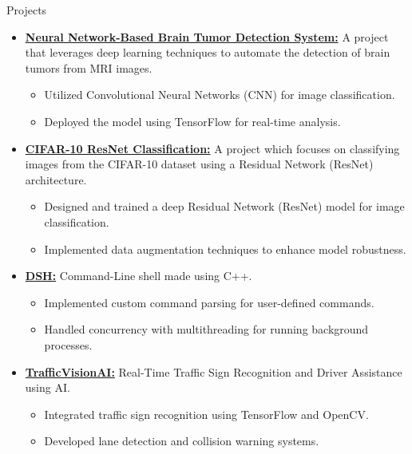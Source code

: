 \documentclass{resume} %
\begin{document}
\begin{rSection}{Projects}

\begin{itemize}  
    \item{\href{https://github.com/mystichronicle/Brain-Tumor-Detection}{{\bf Neural Network-Based Brain Tumor Detection System:}} 
    A project that leverages deep learning techniques to automate the detection of brain tumors from MRI images.
    \begin{itemize}
        \item Utilized Convolutional Neural Networks (CNN) for image classification.
        \item Deployed the model using TensorFlow for real-time analysis.
    \end{itemize}}

    \item{\href{https://github.com/mystichronicle/cifar10-resnet-classification}{{\bf CIFAR-10 ResNet Classification:}} 
    A project which focuses on classifying images from the CIFAR-10 dataset using a Residual Network (ResNet) architecture.
    \begin{itemize}
        \item Designed and trained a deep Residual Network (ResNet) model for image classification.
        \item Implemented data augmentation techniques to enhance model robustness.
    \end{itemize}}
    
       \item {\href{https://github.com/mystichronicle/dsh}{{\bf DSH:}}
    Command-Line shell made using C++.
    \begin{itemize}
        \item Implemented custom command parsing for user-defined commands.
        \item Handled concurrency with multithreading for running background processes.
    \end{itemize}}
    
    \item{\href{https://github.com/mystichronicle/TrafficVisionAI}{{\bf TrafficVisionAI:}} 
    Real-Time Traffic Sign Recognition and Driver Assistance using AI.
    \begin{itemize}
        \item Integrated traffic sign recognition using TensorFlow and OpenCV.
        \item Developed lane detection and collision warning systems.
    \end{itemize}}
    

\end{itemize}
\end{rSection}
\end{document}
